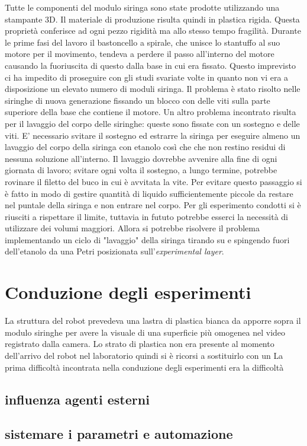 Tutte le componenti del modulo siringa sono state prodotte utilizzando una stampante 3D. Il materiale di produzione risulta quindi in plastica rigida. Questa proprietà conferisce ad ogni pezzo rigidità ma allo stesso tempo fragilità. Durante le prime fasi del lavoro il bastoncello a spirale, che unisce lo stantuffo al suo motore per il movimento, tendeva a perdere il passo all'interno del motore causando la fuoriuscita di questo dalla base in cui era fissato. Questo imprevisto ci ha impedito di proseguire con gli studi svariate volte in quanto non vi era a disposizione un elevato numero di moduli siringa. Il problema è stato risolto nelle siringhe di nuova generazione fissando un blocco con delle viti sulla parte superiore della base che contiene il motore. 
Un altro problema incontrato risulta per il lavaggio del corpo delle siringhe: queste sono fissate con un sostegno e delle viti. E' necessario svitare il sostegno ed estrarre la siringa per eseguire almeno un lavaggio del corpo della siringa con etanolo così che che non restino residui di nessuna soluzione all'interno. Il lavaggio dovrebbe avvenire alla fine di ogni giornata di lavoro; svitare ogni volta il sostegno, a lungo termine, potrebbe rovinare il filetto del buco in cui è avvitata la vite. Per evitare questo passaggio si è fatto in modo di gestire quantità di liquido sufficientemente piccole da restare nel puntale della siringa e non entrare nel corpo. Per gli esperimento condotti si è riusciti a rispettare il limite, tuttavia in fututo potrebbe esserci la necessità di utilizzare dei volumi maggiori. Allora si potrebbe risolvere il problema implementando un ciclo di "lavaggio" della siringa tirando su e spingendo fuori dell'etanolo da una Petri posizionata sull'\emph{experimental layer}. 

\section{Conduzione degli esperimenti}
\label{sec:123}
La struttura del robot prevedeva una lastra di plastica bianca da apporre sopra il modulo siringhe per avere la visuale di una superficie più omogenea nel video registrato dalla camera. Lo strato di plastica non era presente al momento dell'arrivo del robot nel laboratorio quindi si è ricorsi a sostituirlo con un 
La prima difficoltà incontrata nella conduzione degli esperimenti era la difficoltà

\subsection{influenza agenti esterni}
\subsection{sistemare i parametri e automazione}